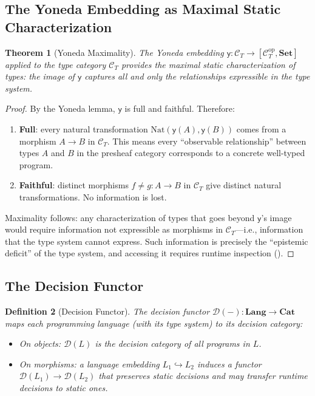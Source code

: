 \documentclass[11pt]{article}
\newtheorem{theorem}{Theorem}[section]
\newtheorem{definition}[theorem]{Definition}
\newcommand{\Cat}{\mathbf{Cat}}
\newcommand{\Set}{\mathbf{Set}}
\newcommand{\Nat}{\mathrm{Nat}}
\begin{document}
\subsection{The Yoneda Embedding as Maximal Static Characterization}

\begin{theorem}[Yoneda Maximality]
\label{thm:yoneda-max}
The Yoneda embedding $\mathsf{y} : \mathcal{C}_T \to [\mathcal{C}_T^{\mathrm{op}}, \Set]$
applied to the type category $\mathcal{C}_T$ provides the \emph{maximal static
characterization} of types: the image of $\mathsf{y}$ captures all and only the
relationships expressible in the type system.
\end{theorem}

\begin{proof}
By the Yoneda lemma, $\mathsf{y}$ is full and faithful. Therefore:
\begin{enumerate}[nosep]
  \item \textbf{Full}: every natural transformation $\Nat(\mathsf{y}(A), \mathsf{y}(B))$
    comes from a morphism $A \to B$ in $\mathcal{C}_T$. This means every ``observable
    relationship'' between types $A$ and $B$ in the presheaf category corresponds to a
    concrete well-typed program.
  \item \textbf{Faithful}: distinct morphisms $f \neq g : A \to B$ in $\mathcal{C}_T$
    give distinct natural transformations. No information is lost.
\end{enumerate}
Maximality follows: any characterization of types that goes beyond $\mathsf{y}$'s image
would require information not expressible as morphisms in $\mathcal{C}_T$---i.e.,
information that the type system cannot express. Such information is precisely the
``epistemic deficit'' of the type system, and accessing it requires runtime inspection
().
\end{proof}

\subsection{The Decision Functor}

\begin{definition}[Decision Functor]
\label{def:decision-functor}
The \emph{decision functor} $\mathcal{D}(-) : \mathbf{Lang} \to \Cat$ maps each
programming language (with its type system) to its decision category:
\begin{itemize}[nosep]
  \item On objects: $\mathcal{D}(L)$ is the decision category of all programs in $L$.
  \item On morphisms: a language embedding $L_1 \hookrightarrow L_2$ induces a functor $\mathcal{D}(L_1) \to \mathcal{D}(L_2)$ that preserves static decisions and may transfer runtime decisions to static ones.
\end{itemize}
\end{definition}
\end{document}

